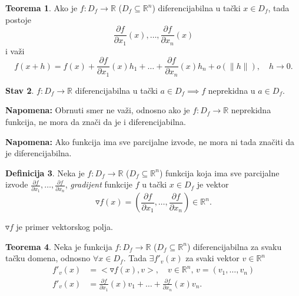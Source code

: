\documentclass[11pt]{article}
\theoremstyle{definition}
\newtheorem{definicija}{Definicija}[section]
\newtheorem{teorema}[definicija]{Teorema}
\newtheorem{stav}[definicija]{Stav}
\theoremstyle{serbnodot}
\newcommand{\napomena}[1]{%
    \textbf{Napomena:} #1
}
\begin{document}

\begin{teorema}
    Ako je \(f: D_f \to \mathbb{R}\) (\(D_f \subseteq \mathbb{R}^n\)) diferencijabilna
    u tački \(x \in D_f\), tada postoje 
    \[
        \frac{\partial f}{\partial x_1}(x), \dots, \frac{\partial f}{\partial x_n}(x)
    \]
    i važi 
    \[
        f(x+h) = f(x) + \frac{\partial f}{\partial x_1}(x)h_1 + \dots + 
        \frac{\partial f}{\partial x_n}(x)h_n + o(\lVert h \rVert), \quad h \to 0.
    \]
\end{teorema}


\begin{stav}
    \(f:D_f \to \mathbb{R}\) diferencijabilna u tački \(a \in D_f \implies f\)
    neprekidna u \(a \in D_f\).

\end{stav}
\napomena{Obrnuti smer ne važi, odnosno ako je \(f: D_f \to \mathbb{R}\) neprekidna funkcija,
ne mora da znači da je i diferencijabilna.}

\napomena{Ako funkcija ima sve parcijalne izvode, ne mora ni tada značiti da je diferencijabilna.}


\begin{definicija}
    Neka je \(f: D_f \to \mathbb{R}\) (\(D_f \subseteq \mathbb{R}^n\)) funkcija koja
    ima sve parcijalne izvode 
    \(\frac{\partial f}{\partial x_1}, \dots, \frac{\partial f}{\partial x_n}\),
    \textit{gradijent} funkcije \(f\) u tački \(x \in D_f\) je vektor
    \[
        \triangledown f(x) = 
        \left(\frac{\partial f}{\partial x_1}, \dots, \frac{\partial f}{\partial x_n}\right) 
        \in \mathbb{R}^n.
    \]
\end{definicija}

\(\triangledown f\) je primer vektorskog polja.


\begin{teorema}
    Neka je funkcija \(f: D_f \to \mathbb{R}\) (\(D_f \subseteq \mathbb{R}^n\))
    diferencijabilna za svaku tačku domena, odnosno 
    \(\forall x \in D_f\). Tada \(\exists f'_v(x)\) za svaki vektor 
    \(v \in \mathbb{R}^n\)
    \begin{align*}
        f'_v(x) &= <\triangledown f(x), v>, \quad v \in \mathbb{R}^n,\, v = (v_1, \dots , v_n) \\
        f'_v(x) &= \frac{\partial f}{\partial x_1}(x)v_1 + \dots
        + \frac{\partial f}{\partial x_n}(x)v_n. 
    \end{align*}
\end{teorema}
\end{document}
